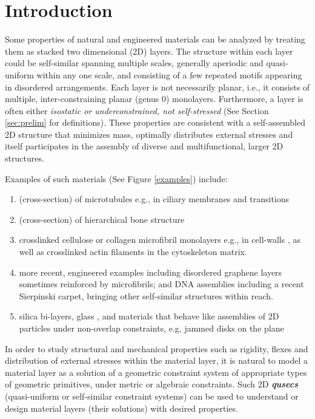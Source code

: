 \section{Introduction}
\label{sec:intro}

Some properties of natural and engineered materials can be analyzed  by
treating them as stacked two dimensional (2D) layers.
The structure within each layer could be
self-similar \cite{Intro1}
spanning multiple scales,
generally aperiodic and quasi-uniform within any one scale,
and consisting of a few repeated motifs appearing in disordered
arrangements. Each layer is not necessarily planar, i.e.,
it consists of multiple,
inter-constraining planar (genus 0) monolayers.
Furthermore, a layer is often  either
{\sl isostatic or underconstrained, not
self-stressed} (See Section \ref{sec:prelim} for definitions).
These properties are
consistent with a self-assembled 2D structure that minimizes mass,
optimally distributes external stresses and itself
participates in the assembly of diverse and multifunctional,
larger 2D structures.

Examples of such materials (See Figure \ref{examples}) include:

\begin{enumerate}
    \item (cross-section) of microtubules \cite{Necklace1} e.g., in
ciliary membranes and transitions \cite{Necklace2}
    \item (cross-section) of hierarchical bone structure \cite{XX} %
    \item crosslinked cellulose or collagen microfibril monolayers e.g.,
in cell-walls \cite{CellWalls1} \cite{CellWalls1}, as well as crosslinked
actin filaments in the cytoskeleton matrix.
    \item more recent, engineered examples including  disordered graphene
layers \cite{Graphene1} \cite{Graphene2} sometimes reinforced
    by  microfibrils; and DNA assemblies \cite{Microfibrils1} including a
recent Sierpinski carpet, bringing other self-similar structures
    \cite{Microfibrils2} within reach.
    \item  silica bi-layers, glass \cite{SilicaGlass1}
\cite{SilicaGlass2}, and materials that behave like assemblies of
    2D particles under non-overlap constraints, e.g, jammed
    disks on the plane \cite{JammedDisk1}
%
\end{enumerate}
%
In order to study structural and mechanical properties
such as rigidity, flexes and distribution of external stresses
within the material layer, it is natural to model a material
layer as a solution of a geometric constraint system
of appropriate types of geometric primitives, under
metric or algebraic constraints.
Such  2D {\bf{\em qusecs}} (quasi-uniform or self-similar
constraint systems) can be used to
understand or design material layers (their solutions)
with desired properties.
%
